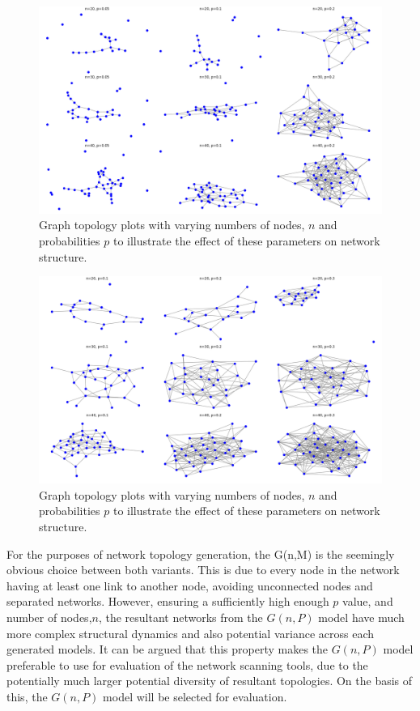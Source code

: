 \begin{figure}
    \centering
    \includegraphics[width=0.75\linewidth]{images/ER/low_prob/low_prob_20,30,40.png}
    \caption{Graph topology plots with varying numbers of nodes, $n$ and probabilities $p$ to illustrate the effect of these parameters on network structure.}
    \label{fig:low_prob_20,30,40}
\end{figure}

\begin{figure}
    \centering
    \includegraphics[width=0.75\linewidth]{images/ER/20,30,40.png}
    \caption{Graph topology plots with varying numbers of nodes, $n$ and probabilities $p$ to illustrate the effect of these parameters on network structure.}
    \label{fig:20,30,40}
\end{figure}

For the purposes of network topology generation, the G(n,M) is the seemingly obvious choice between both variants. This is due to every node in the network having at least one link to another node, avoiding unconnected nodes and separated networks. However, ensuring a sufficiently high enough $p$ value, and number of nodes,$n$,  the resultant networks from the $G(n,P)$ model have much more complex structural dynamics and also potential variance across each generated models. It can be argued that this property makes the $G(n,P)$ model preferable to use for evaluation of the network scanning tools, due to the potentially much larger potential diversity of resultant topologies. On the basis of this, the $G(n,P)$ model will be selected for evaluation.

